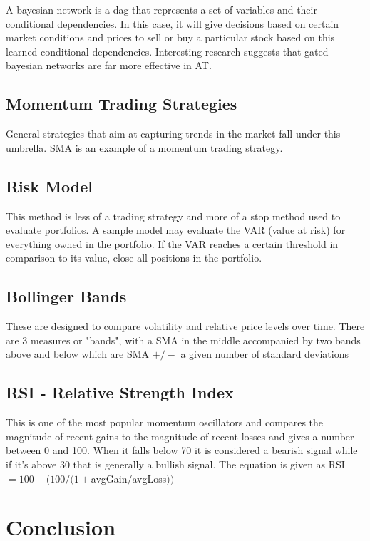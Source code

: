 \documentclass[letterpaper,11pt]{article}
\begin{document}
A bayesian network is a dag that represents a set of variables and their conditional dependencies. In this case, it will give decisions based on certain market conditions and prices to sell or buy a particular stock based on this learned conditional dependencies. Interesting research suggests that gated bayesian networks are far more effective in AT. 

\subsection*{Momentum Trading Strategies}

General strategies that aim at capturing trends in the market fall under this umbrella. SMA is an example of a momentum trading strategy. 

\subsection*{Risk Model}

This method is less of a trading strategy and more of a stop method used to evaluate portfolios. A sample model may evaluate the VAR (value at risk) for everything owned in the portfolio. If the VAR reaches a certain threshold in comparison to its value, close all positions in the portfolio. 

\subsection*{Bollinger Bands}

These are designed to compare volatility and relative price levels over time. There are 3 measures or "bands", with a SMA in the middle accompanied by two bands above and below which are SMA $+/-$ a given number of standard deviations

\subsection*{RSI - Relative Strength Index}

This is one of the most popular momentum oscillators and compares the magnitude of recent gains to the magnitude of recent losses and gives a number between 0 and 100. When it falls below 70 it is considered a bearish signal while if it's above 30 that is generally a bullish signal. The equation is given as RSI $= 100 - (100/(1+$avgGain$/$avgLoss$))$

\section*{Conclusion}
\end{document}
